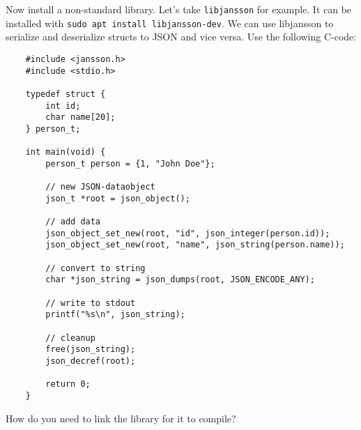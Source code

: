 \documentclass{dcbl/challenge}
\begin{document}
\begin{aufgabe}
    Now install a non-standard library.
    Let's take \texttt{libjansson} for example. 
    It can be installed with \texttt{sudo apt install libjansson-dev}.
    We can use libjansson to serialize and deserialize structs to JSON and vice versa.
    Use the following C-code:
    \begin{lstlisting}
    #include <jansson.h>
    #include <stdio.h>
    
    typedef struct {
        int id;
        char name[20];
    } person_t;
    
    int main(void) {
        person_t person = {1, "John Doe"};
    
        // new JSON-dataobject
        json_t *root = json_object();
        
        // add data
        json_object_set_new(root, "id", json_integer(person.id));
        json_object_set_new(root, "name", json_string(person.name));
    
        // convert to string
        char *json_string = json_dumps(root, JSON_ENCODE_ANY);
    
        // write to stdout
        printf("%s\n", json_string);
    
        // cleanup
        free(json_string);
        json_decref(root);
    
        return 0;
    }
    \end{lstlisting}  
    How do you need to link the library for it to compile?      
\end{aufgabe}
\end{document}
